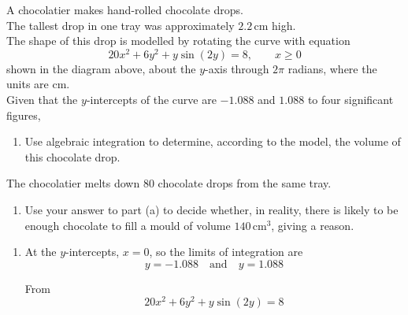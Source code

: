 \documentclass[leqno]{article}
\begin{document}
\begin{enumerate}[
  label=\textbf{\arabic*.},
  leftmargin=*,
  topsep=0pt,
  partopsep=0pt,
  parsep=0pt
]
\begin{figure}[H]
\end{figure}


A chocolatier makes hand-rolled chocolate drops. \\

The tallest drop in one tray was approximately $2.2\,\mathrm{cm}$ high. \\

The shape of this drop is modelled by rotating the curve with equation
\[
20x^2 + 6y^2 + y\sin(2y) = 8, \qquad x \geq 0
\]
shown in the diagram above, about the $y$-axis through $2\pi$ radians, where the units are cm. \\

Given that the $y$-intercepts of the curve are $-1.088$ and $1.088$ to four significant figures, \\

\begin{enumerate}[label=\textbf{(\alph*)}]
  \item Use algebraic integration to determine, according to the model, the volume of this chocolate drop.  \\
\end{enumerate}
The chocolatier melts down $80$ chocolate drops from the same tray. \\
\begin{enumerate}[label=\textbf{(\alph*)}, resume]
  \item Use your answer to part (a) to decide whether, in reality, there is likely to be enough chocolate to fill a mould of volume $140\,\mathrm{cm}^3$, giving a reason.  \\
\end{enumerate}

\vspace*{10pt}

\begin{djsSolution}
\begin{enumerate}[label=\textbf{(\alph*)}]
  \item At the $y$-intercepts, $x=0$, so the limits of integration are
\[
y=-1.088 \quad \text{and} \quad y=1.088
\]

From
\[
20x^2+6y^2+y\sin(2y)=8
\]


\end{enumerate}
\end{djsSolution}
\end{enumerate}
\end{document}
